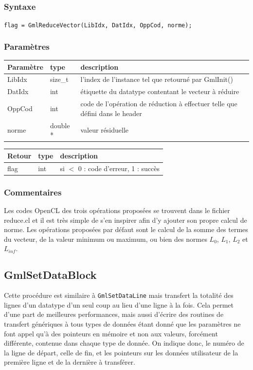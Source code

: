 \documentclass[a4paper,12pt]{article}
\begin{document}
\subsubsection*{Syntaxe}

{\tt flag = GmlReduceVector(LibIdx, DatIdx, OppCod, norme);}

\subsubsection*{Paramètres}

\begin{tabular}{|m{2cm}|m{1.5cm}|m{10.5cm}|}
\hline
Paramètre  & type     & description \\
\hline
LibIdx     & size\_t  & l'index de l'instance tel que retourné par GmlInit() \\
\hline
DatIdx     & int      & étiquette du datatype contentant le vecteur à réduire  \\
\hline
OppCod     & int      & code de l'opération de réduction à effectuer telle que défini dans le header \\
\hline
norme      & double * & valeur résiduelle \\
\hline
\end{tabular}

\medskip

\begin{tabular}{|m{2cm}|m{1.5cm}|m{10.5cm}|}
\hline
Retour     & type   & description \\
\hline
flag       & int    & si $<$ 0 : code d'erreur, 1 : succès  \\
\hline
\end{tabular}

\subsubsection*{Commentaires}
Les codes OpenCL des trois opérations proposées se trouvent dans le fichier reduce.cl et il est très simple de s'en inspirer afin d'y ajouter son propre calcul de norme.
Les opérations proposées par défaut sont le calcul de la somme des termes du vecteur, de la valeur minimum ou maximum, ou bien des normes $L_0$, $L_1$, $L_2$ et $L_{inf}$.


\subsection{GmlSetDataBlock}

Cette procédure est similaire à {\tt GmlSetDataLine} mais transfert la totalité des lignes d'un datatype d'un seul coup au lieu d'une ligne à la fois. Cela permet d'une part de meilleures performances, mais aussi d'écrire des routines de transfert génériques à tous types de données étant donné que les paramètres ne font appel qu'à des pointeurs en mémoire et non aux valeurs, forcément différente, contenue dans chaque type de donnée.
On indique donc, le numéro de la ligne de départ, celle de fin, et les pointeurs sur les données utilisateur de la première ligne et de la dernière à transférer.
\end{document}
